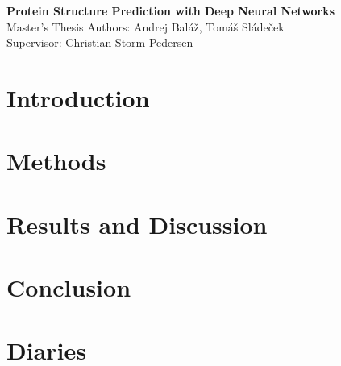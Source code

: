 \documentclass[12pt]{article}
\begin{document}
\begin{titlepage}
    \begin{center}
        \vspace*{8cm}
        \Huge
            \textbf{Protein Structure Prediction with Deep Neural Networks}
        \vspace{0.5cm}\\
        \LARGE
            Master's Thesis
        \vfill
        \vspace{0.8cm}
        \Large
            Authors: Andrej Baláž, Tomáš Sládeček\\
            Supervisor: Christian Storm Pedersen
    \end{center}
\end{titlepage}
\pagebreak

\section{Introduction}


\section{Methods}


\section{Results and Discussion}


\section{Conclusion}


\section{Diaries}


\end{document}
